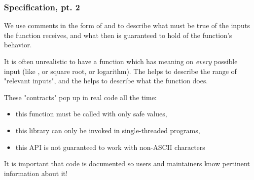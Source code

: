 \documentclass[aspectratio=169]{beamer}
\begin{document}
\begin{frame}[fragile]
  \frametitle{Specification, pt. 2}

  We use comments in the form of  and  to describe 
  what must be true of the inputs the function receives, and what then is guaranteed 
  to hold of the function's behavior. 

  \pause
  \vspace{\fill}

  It is often unrealistic to have a function which has meaning on \textit{every} possible 
  input (like , or square root, or logarithm). The  helps to
  describe the range of "relevant inputs", and the  helps to describe
  what the function does.

  \pause
  \vspace{\fill}

  These "contracts" pop up in real code all the time:
  \pause
  \begin{itemize}
    \item this function must be called with only safe values, \pause
    \item this library can only be invoked in single-threaded programs, \pause
    \item this API is not guaranteed to work with non-ASCII characters \pause 
  \end{itemize}

  \vspace{\fill}

  It is important that code is documented so users and maintainers know pertinent
  information about it! 
\end{frame}
\end{document}
